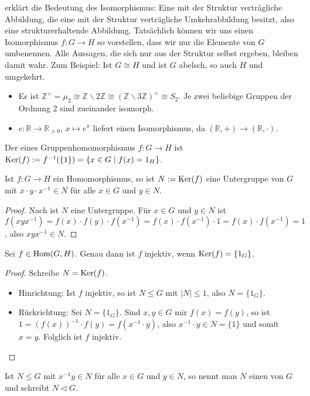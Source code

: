 \begin{remark}
	 erklärt die Bedeutung des Isomorphismus: Eine mit der Struktur verträgliche 
	Abbildung, die eine mit der Struktur verträgliche Umkehrabbildung besitzt, also eine strukturerhaltende Abbildung. 
	Tatsächlich können wir uns einen Isomorphismus $f: G\to H$ so vorstellen, dass wir nur die Elemente von $G$ umbenennen. 
	Alle Aussagen, die sich nur aus der Struktur selbst ergeben, bleiben damit wahr. Zum Beispiel: Ist $G\cong H$ und ist 
	$G$ abelsch, so auch $H$ und umgekehrt.
\end{remark}

\begin{example}
	\begin{itemize}
		\item Es ist $\mathbb Z^{\times} = \mu_2 \cong \mathbb Z\backslash 2\mathbb Z\cong (\mathbb Z\backslash 3\mathbb Z)
		^{\times}\cong S_2$. Je zwei beliebige Gruppen der Ordnung 2 sind zueinander isomorph.
		\item $e: \mathbb R \to \mathbb R_{>0}$, $x\mapsto e^x$ liefert einen Isomorphismus, da $(\mathbb R,+)\to 
		(\mathbb R,\cdot)$.
	\end{itemize}
\end{example}

\begin{definition}[Kern]
	Der  eines Gruppenhomomorphismus $f:G\to H$ ist $\operatorname{Ker}(f):= f^{-1}(\{1\})=\{x\in G \mid
	f(x)=1_H\}$.
\end{definition}

\begin{lemma}
	Ist $f:G\to H$ ein Homomorphismus, so ist $N:=\operatorname{Ker}(f)$ eine Untergruppe von $G$ mit $x\cdot y\cdot 
	x^{-1}\in N$ für alle $x\in G$ und $y\in N$.
\end{lemma}
\begin{proof}
	Nach  ist $N$ eine Untergruppe. Für $x\in G$ und $y\in N$ ist $f(xyx^{-1})=f(x)\cdot f(y)\cdot f(x^{-1})=f(x)\cdot f(x^{-1}) \cdot 1=
	f(x)\cdot f(x^{-1})=1$, also $xyx^{-1}\in N$.
\end{proof}

\begin{proposition}
	Sei $f\in \operatorname{Hom}(G,H)$. Genau dann ist $f$ injektiv, wenn $\operatorname{Ker}(f)=\{1_G\}$.
\end{proposition}
\begin{proof}
	Schreibe $N=\operatorname{Ker}(f)$.
	\begin{itemize}
		\item Hinrichtung: Ist $f$ injektiv, so ist $N\le G$ mit $|N|\le 1$, also $N=\{1_G\}$.
		\item Rückrichtung: Sei $N=\{1_G\}$. Sind $x,y\in G$ mir $f(x)=f(y)$, so ist $1=(f(x))^{-1}\cdot f(y)=f(x^{-1}\cdot y)$, 
		also $x^{-1}\cdot y\in N=\{1\}$ und somit $x=y$. Folglich ist $f$ injektiv.
	\end{itemize}
\end{proof}

\begin{definition}[Normalteiler]
	Ist $N\le G$ mit $x^{-1}y\in N$ für alle $x\in G$ und $y\in N$, so nennt man $N$ 
	einen  von $G$ und schreibt $N\vartriangleleft G$.
\end{definition}